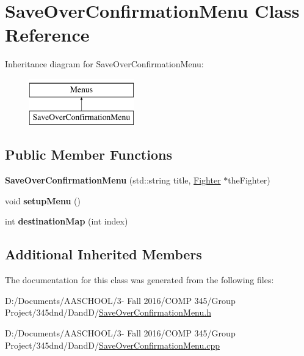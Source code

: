 \hypertarget{class_save_over_confirmation_menu}{}\section{Save\+Over\+Confirmation\+Menu Class Reference}
\label{class_save_over_confirmation_menu}
Inheritance diagram for Save\+Over\+Confirmation\+Menu\+:\begin{figure}[H]
\begin{center}
\leavevmode
\includegraphics[height=2.000000cm]{class_save_over_confirmation_menu}
\end{center}
\end{figure}
\subsection*{Public Member Functions}
\begin{DoxyCompactItemize}
\item 
\hypertarget{class_save_over_confirmation_menu_ac503e7b8eaed6f8a5b2ea6955bcdb477}{}\label{class_save_over_confirmation_menu_ac503e7b8eaed6f8a5b2ea6955bcdb477} 
{\bfseries Save\+Over\+Confirmation\+Menu} (std\+::string title, \hyperlink{class_fighter}{Fighter} $\ast$the\+Fighter)
\item 
\hypertarget{class_save_over_confirmation_menu_a60919591d595ec18cd0f972238c86afc}{}\label{class_save_over_confirmation_menu_a60919591d595ec18cd0f972238c86afc} 
void {\bfseries setup\+Menu} ()
\item 
\hypertarget{class_save_over_confirmation_menu_a186f70712e392e4e46010d0785f98914}{}\label{class_save_over_confirmation_menu_a186f70712e392e4e46010d0785f98914} 
int {\bfseries destination\+Map} (int index)
\end{DoxyCompactItemize}
\subsection*{Additional Inherited Members}


The documentation for this class was generated from the following files\+:\begin{DoxyCompactItemize}
\item 
D\+:/\+Documents/\+A\+A\+S\+C\+H\+O\+O\+L/3-\/ Fall 2016/\+C\+O\+M\+P 345/\+Group Project/345dnd/\+Dand\+D/\hyperlink{_save_over_confirmation_menu_8h}{Save\+Over\+Confirmation\+Menu.\+h}\item 
D\+:/\+Documents/\+A\+A\+S\+C\+H\+O\+O\+L/3-\/ Fall 2016/\+C\+O\+M\+P 345/\+Group Project/345dnd/\+Dand\+D/\hyperlink{_save_over_confirmation_menu_8cpp}{Save\+Over\+Confirmation\+Menu.\+cpp}\end{DoxyCompactItemize}
